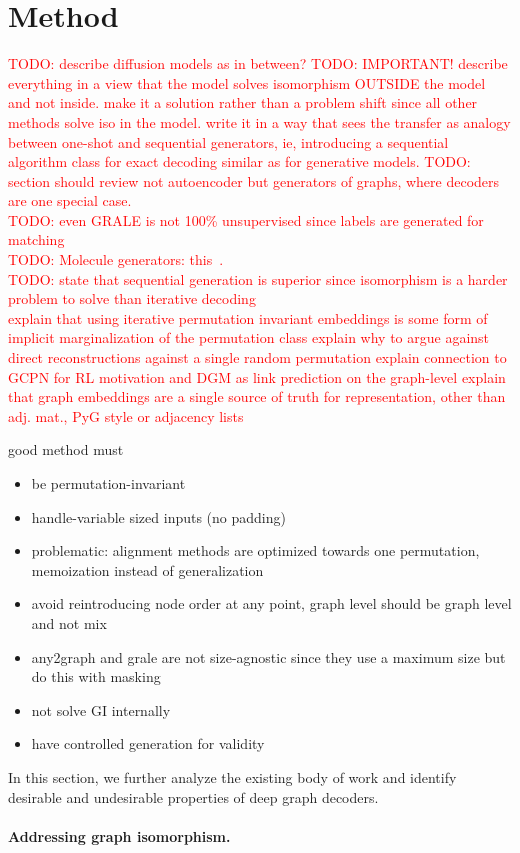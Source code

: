 \section{Method}\label{sec:method}
\textcolor{red}{TODO: describe diffusion models as in between?}
\textcolor{red}{
    TODO: IMPORTANT! describe everything in a view that the model solves isomorphism OUTSIDE the model and not inside.
    make it a solution rather than a problem shift since all other methods solve iso in the model. write it in a way
    that sees the transfer as analogy between one-shot and sequential generators, ie, introducing a sequential algorithm class for
    exact decoding similar as for generative models.
}
\textcolor{red}{
    TODO: section should review not autoencoder but generators of graphs, where decoders are one special case.
}\\
\textcolor{red}{TODO: even GRALE is not 100\% unsupervised since labels are generated for matching}\\
\textcolor{red}{TODO: Molecule generators: this~\cite{mercadopractical}.}\\
\textcolor{red}{TODO: state that sequential generation is superior since isomorphism is a harder problem to solve than iterative decoding}\\
\textcolor{red}{explain that using iterative permutation invariant embeddings is some form of implicit marginalization of the permutation class}
\textcolor{red}{explain why to argue against direct reconstructions against a single random permutation}
\textcolor{red}{explain connection to GCPN for RL motivation and DGM as link prediction on the graph-level}
\textcolor{red}{explain that graph embeddings are a single source of truth for representation, other than adj. mat., PyG style or adjacency lists}


good method must
\begin{itemize}
    \item be permutation-invariant
    \item handle-variable sized inputs (no padding)
    \item problematic: alignment methods are optimized towards one permutation, memoization instead of generalization
    \item avoid reintroducing node order at any point, graph level should be graph level and not mix
    \item any2graph and grale are not size-agnostic since they use a maximum size but do this with masking
    \item not solve GI internally
    \item have controlled generation for validity

\end{itemize}

In this section, we further analyze the existing body of work and identify desirable and undesirable properties
of deep graph decoders.

\paragraph{Addressing graph isomorphism.}
